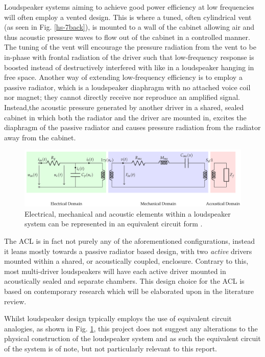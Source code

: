 \documentclass{report}
\begin{document}
        Loudspeaker systems aiming to achieve good power efficiency at low frequencies will often employ a vented design.
        This is where a tuned, often cylindrical vent (as seen in Fig. \ref{hs-7back}), is mounted to a wall of the cabinet allowing air and thus acoustic pressure waves to flow out of the cabinet in a controlled manner.
        The tuning of the vent will encourage the pressure radiation from the vent to be in-phase with frontal radiation of the driver such that low-frequency response is boosted instead of destructively interfered with like in a loudspeaker hanging in free space.
        Another way of extending low-frequency efficiency is to employ a passive radiator, which is a loudspeaker diaphragm with no attached voice coil nor magnet; they cannot directly receive nor reproduce an amplified signal.
        Instead,the acoustic pressure generated by another driver in a shared, sealed cabinet in which both the radiator and the driver are mounted in, excites the diaphragm of the passive radiator and causes pressure radiation from the radiator away from the cabinet.

        \begin{figure}[H]
            \centering
            \includegraphics[width = \textwidth]{figs/equivalentCircuit.png}
            \caption{Electrical, mechanical and acoustic elements within a loudspeaker system can be represented in an equivalent circuit form \cite{liechti2021total}.}
            \label{equivalentCircuit}
        \end{figure}

        The ACL is in fact not purely any of the aforementioned configurations, instead it leans mostly towards a passive radiator based design, with two \textit{active} drivers mounted within a shared, or acoustically coupled, enclosure.
        Contrary to this, most multi-driver loudspeakers will have each active driver mounted in acoustically sealed and separate chambers.
        This design choice for the ACL is based on contemporary research which will be elaborated upon in the literature review.

        Whilst loudspeaker design typically employs the use of equivalent circuit analogies, as shown in Fig. \ref{equivalentCircuit}, this project does not suggest any alterations to the physical construction of the loudspeaker system and as such the equivalent circuit of the system is of note, but not particularly relevant to this report.
        
\end{document}
